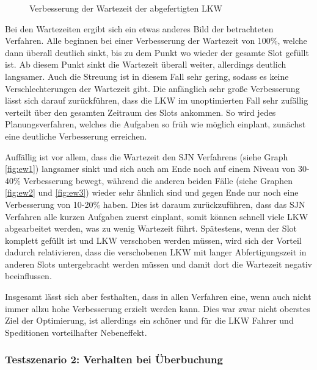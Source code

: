 \begin{figure}[H]
\caption{Verbesserung der Wartezeit der abgefertigten LKW}
\label{fig:evalWartezeit}
\end{figure}

Bei den Wartezeiten ergibt sich ein etwas anderes Bild der betrachteten Verfahren. Alle beginnen bei einer Verbesserung der Wartezeit von 100\%, welche dann überall deutlich sinkt, bis zu dem Punkt wo wieder der gesamte Slot gefüllt ist. Ab diesem Punkt sinkt die Wartezeit überall weiter, allerdings deutlich langsamer. Auch die Streuung ist in diesem Fall sehr gering, sodass es keine Verschlechterungen der Wartezeit gibt.  Die anfänglich sehr große Verbesserung lässt sich darauf zurückführen, dass die LKW im unoptimierten Fall sehr zufällig verteilt über den gesamten Zeitraum des Slots ankommen. So wird jedes Planungsverfahren, welches die Aufgaben so früh wie möglich einplant, zunächst eine deutliche Verbesserung erreichen.

Auffällig ist vor allem, dass die Wartezeit den SJN Verfahrens (siehe Graph \ref{fig:ew1}) langsamer sinkt und sich auch am Ende noch auf einem Niveau von 30-40\% Verbesserung bewegt, während die anderen beiden Fälle (siehe Graphen \ref{fig:ew2} und \ref{fig:ew3}) wieder sehr ähnlich sind und gegen Ende nur noch eine Verbesserung von 10-20\% haben. Dies ist daraum zurückzuführen, dass das SJN Verfahren alle kurzen Aufgaben zuerst einplant, somit können schnell viele LKW abgearbeitet werden, was zu wenig Wartezeit führt. Spätestens, wenn der Slot komplett gefüllt ist und LKW verschoben werden müssen, wird sich der Vorteil dadurch relativieren, dass die verschobenen LKW mit langer Abfertigungszeit in anderen Slots untergebracht werden müssen und damit dort die Wartezeit negativ beeinflussen.

Insgesamt lässt sich aber festhalten, dass in allen Verfahren eine, wenn auch nicht immer allzu hohe Verbesserung erzielt werden kann. Dies war zwar nicht oberstes Ziel der Optimierung, ist allerdings ein schöner und für die LKW Fahrer und Speditionen vorteilhafter Nebeneffekt.



\subsubsection{Testszenario 2: Verhalten bei Überbuchung}

